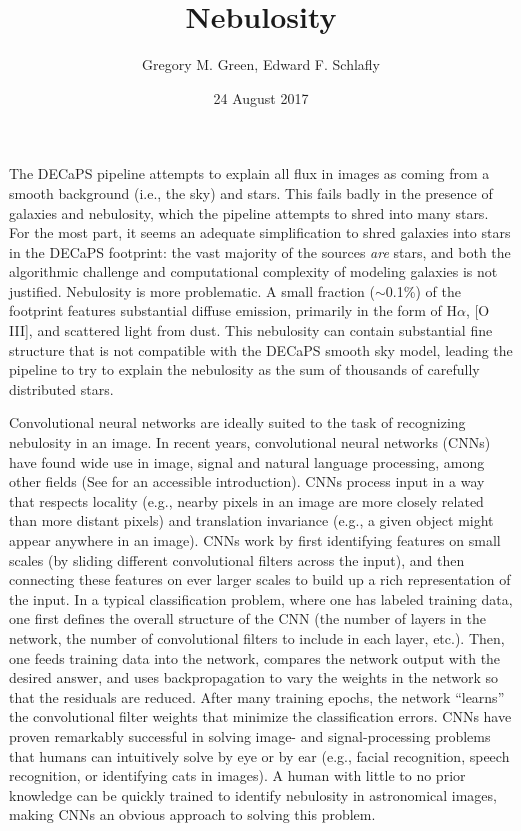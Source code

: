 \documentclass[12pt,twocolumn]{article}
\title{Nebulosity}
\author{Gregory M. Green, Edward F. Schlafly}
\date{24 August 2017}
\begin{document}
\maketitle

The DECaPS pipeline attempts to explain all flux in images as coming from a smooth background (i.e., the sky) and stars. This fails badly in the presence of galaxies and nebulosity, which the pipeline attempts to shred into many stars. For the most part, it seems an adequate simplification to shred galaxies into stars in the DECaPS footprint: the vast majority of the sources \textit{are} stars, and both the algorithmic challenge and computational complexity of modeling galaxies is not justified. Nebulosity is more problematic. A small fraction ($\sim$0.1\%) of the footprint features substantial diffuse emission, primarily in the form of H$\alpha$, [O III], and scattered light from dust. This nebulosity can contain substantial fine structure that is not compatible with the DECaPS smooth sky model, leading the pipeline to try to explain the nebulosity as the sum of thousands of carefully distributed stars.

Convolutional neural networks are ideally suited to the task of recognizing nebulosity in an image. In recent years, convolutional neural networks (CNNs) have found wide use in image, signal and natural language processing, among other fields (See \citealt{LeCun2015} for an accessible introduction). CNNs process input in a way that respects locality (e.g., nearby pixels in an image are more closely related than more distant pixels) and translation invariance (e.g., a given object might appear anywhere in an image). CNNs work by first identifying features on small scales (by sliding different convolutional filters across the input), and then connecting these features on ever larger scales to build up a rich representation of the input. In a typical classification problem, where one has labeled training data, one first defines the overall structure of the CNN (the number of layers in the network, the number of convolutional filters to include in each layer, etc.). Then, one feeds training data into the network, compares the network output with the desired answer, and uses backpropagation to vary the weights in the network so that the residuals are reduced. After many training epochs, the network ``learns'' the convolutional filter weights that minimize the classification errors. CNNs have proven remarkably successful in solving image- and signal-processing problems that humans can intuitively solve by eye or by ear (e.g., facial recognition, speech recognition, or identifying cats in images). A human with little to no prior knowledge can be quickly trained to identify nebulosity in astronomical images, making CNNs an obvious approach to solving this problem.
\end{document}
